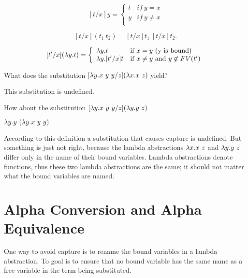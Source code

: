 \begin{definition} 
\label{def:sub}
\[
[t/x]y = \left\{ \begin{array}{ll}
        t & if~y = x \\
        y & if~y\neq x \\
        \end{array} \right.
\]


\[
[t/x](t_1~t_2) = [t/x]t_1~[t/x]t_2.
 \]

\[
[t'/x](\lambda y.t) = 
\left\{ \begin{array}{ll}

\lambda y.t &\mbox{if}~ x = y \mbox{ (y is bound)} \\

\lambda y.[t'/x]t &\mbox{if}~ x \neq y \mbox { and } y \not \in FV(t') \\

\end{array} \right. 
\]
\end{definition}

\begin{flex}
\begin{exercise}
What does the substitution $[\lambda y.x~y~y/z](\lambda x.x~z)$ yield?
\end{exercise}
\begin{solution}
This substitution is undefined.
\end{solution}
\end{flex}

\begin{flex}
\begin{exercise}
How about the substitution  $[\lambda y.x~y~y/z](\lambda y.y~z)$
\end{exercise}
\begin{solution}
$\lambda y.y~(\lambda y.x~y~y)$
\end{solution}
\end{flex}

According to this definition a substitution that causes capture is
undefined.  But something is just not right, because the lambda
abstractions $\lambda x.x~z$ and $\lambda y.y~z$ differ only in the name of
their bound variables.  Lambda abstractions denote functions, thus
these two lambda abstractions are the same; it should not matter what
the bound variables are named.

\section{Alpha Conversion and Alpha Equivalence}
One way to avoid capture is to rename the bound variables in a lambda
abstraction.  To goal is to ensure that no bound variable has the same
name as a free variable in the term being substituted.  

